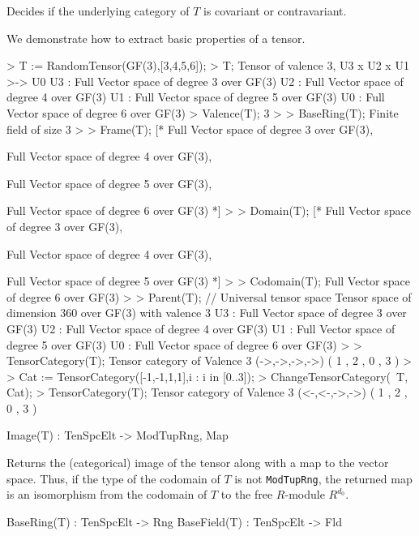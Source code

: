 Decides if the underlying category of $T$ is covariant or contravariant.

\begin{example}
We demonstrate how to extract basic properties of a tensor.

\begin{code}
> T := RandomTensor(GF(3),[3,4,5,6]);
> T;
Tensor of valence 3, U3 x U2 x U1 >-> U0
U3 : Full Vector space of degree 3 over GF(3)
U2 : Full Vector space of degree 4 over GF(3)
U1 : Full Vector space of degree 5 over GF(3)
U0 : Full Vector space of degree 6 over GF(3)
> Valence(T);
3
> 
> BaseRing(T);
Finite field of size 3
> 
> Frame(T);
[*
    Full Vector space of degree 3 over GF(3),

    Full Vector space of degree 4 over GF(3),

    Full Vector space of degree 5 over GF(3),

    Full Vector space of degree 6 over GF(3)
*]
> 
> Domain(T);
[*
    Full Vector space of degree 3 over GF(3),

    Full Vector space of degree 4 over GF(3),

    Full Vector space of degree 5 over GF(3)
*]
> 
> Codomain(T);
Full Vector space of degree 6 over GF(3)
> 
> Parent(T); // Universal tensor space
Tensor space of dimension 360 over GF(3) with valence 3
U3 : Full Vector space of degree 3 over GF(3)
U2 : Full Vector space of degree 4 over GF(3)
U1 : Full Vector space of degree 5 over GF(3)
U0 : Full Vector space of degree 6 over GF(3)
> 
> TensorCategory(T);
Tensor category of Valence 3 (->,->,->,->) ({ 1 },{ 2 },{ 0 },{ 3 })
> 
> Cat := TensorCategory([-1,-1,1,1],{{i} : i in [0..3]});
> ChangeTensorCategory(~T, Cat);
> TensorCategory(T);
Tensor category of Valence 3 (<-,<-,->,->) ({ 1 },{ 2 },{ 0 },{ 3 })
\end{code}
\end{example}

\begin{intrinsics}
Image(T) : TenSpcElt -> ModTupRng, Map
\end{intrinsics}

Returns the (categorical) image of the tensor along with a map to the vector space.
Thus, if the type of the codomain of $T$ is not {\tt ModTupRng}, the returned map
is an isomorphism from the codomain of $T$ to the free $R$-module $R^{d_0}$. 

\begin{intrinsics}
BaseRing(T) : TenSpcElt -> Rng
BaseField(T) : TenSpcElt -> Fld
\end{intrinsics}

